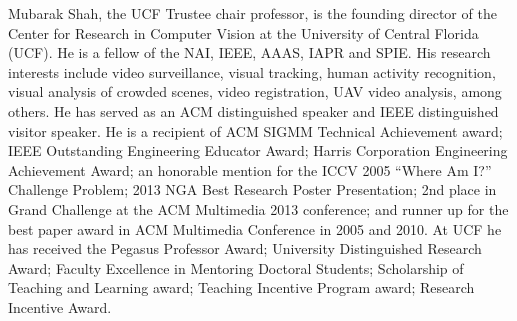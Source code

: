 \documentclass[10pt,journal,compsoc]{IEEEtran}
\begin{document}
\begin{IEEEbiography}
{Mubarak Shah}, the UCF Trustee chair professor, is the founding director of the Center for Research in Computer Vision at the University of Central Florida (UCF). He is a fellow of the NAI, IEEE, AAAS, IAPR and SPIE. His research interests include video surveillance, visual tracking, human activity recognition, visual analysis of crowded scenes, video registration, UAV video analysis, among others. He has served as an ACM distinguished speaker and IEEE distinguished visitor speaker. He is a recipient of ACM SIGMM Technical Achievement award; IEEE Outstanding Engineering Educator Award; Harris Corporation Engineering Achievement Award; an honorable mention for the ICCV 2005 ``Where Am I?'' Challenge Problem; 2013 NGA Best Research Poster Presentation; 2nd place in Grand Challenge at the ACM Multimedia 2013 conference; and runner up for the best paper award in ACM Multimedia Conference in 2005 and 2010. At UCF he has received the Pegasus Professor Award; University Distinguished Research Award; Faculty Excellence in Mentoring Doctoral Students; Scholarship of Teaching and Learning award; Teaching Incentive Program award; Research Incentive Award.
\end{IEEEbiography}
\end{document}
